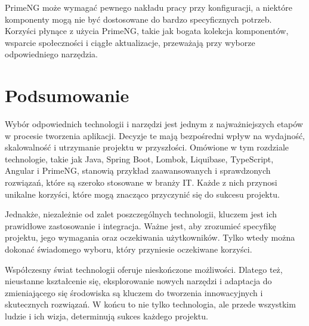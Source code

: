 PrimeNG może wymagać pewnego nakładu pracy przy konfiguracji, a niektóre komponenty mogą nie być dostosowane do bardzo specyficznych potrzeb. Korzyści płynące z użycia PrimeNG, takie jak bogata kolekcja komponentów, wsparcie społeczności i ciągłe aktualizacje, przeważają przy wyborze odpowiedniego narzędzia\cite{primengSpecs}.

\section{Podsumowanie}

Wybór odpowiednich technologii i narzędzi jest jednym z najważniejszych etapów w procesie tworzenia aplikacji. Decyzje te mają bezpośredni wpływ na wydajność, skalowalność i utrzymanie projektu w przyszłości. Omówione w tym rozdziale technologie, takie jak Java, Spring Boot, Lombok, Liquibase, TypeScript, Angular i PrimeNG, stanowią przykład zaawansowanych i sprawdzonych rozwiązań, które są szeroko stosowane w branży IT. Każde z nich przynosi unikalne korzyści, które mogą znacząco przyczynić się do sukcesu projektu.

Jednakże, niezależnie od zalet poszczególnych technologii, kluczem jest ich prawidłowe zastosowanie i integracja. Ważne jest, aby zrozumieć specyfikę projektu, jego wymagania oraz oczekiwania użytkowników. Tylko wtedy można dokonać świadomego wyboru, który przyniesie oczekiwane korzyści.

Współczesny świat technologii oferuje nieskończone możliwości. Dlatego też, nieustanne kształcenie się, eksplorowanie nowych narzędzi i adaptacja do zmieniającego się środowiska są kluczem do tworzenia innowacyjnych i skutecznych rozwiązań. W końcu to nie tylko technologia, ale przede wszystkim ludzie i ich wizja, determinują sukces każdego projektu.